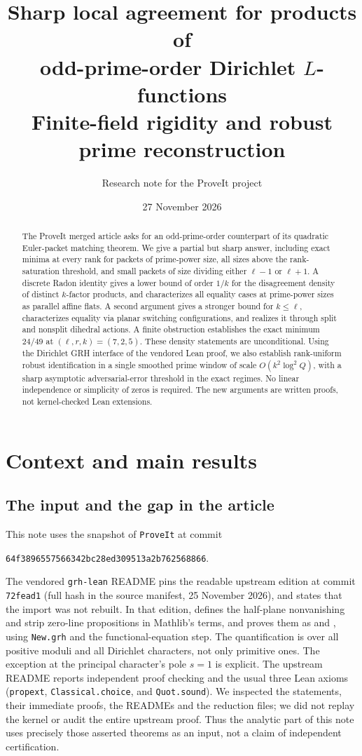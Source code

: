\documentclass[11pt]{article}
\title{Sharp local agreement for products of\\odd-prime-order Dirichlet $L$-functions\\[3pt]\large Finite-field rigidity and robust prime reconstruction}
\author{Research note for the ProveIt project}
\date{27 November 2026}
\theoremstyle{remark}\newtheorem{remark}[theorem]{Remark}
\begin{document}
\maketitle
\begin{abstract}
The ProveIt merged article asks for an odd-prime-order counterpart of its quadratic Euler-packet matching theorem. We give a partial but sharp answer, including exact minima at every rank for packets of prime-power size, all sizes above the rank-saturation threshold, and small packets of size dividing either $\ell-1$ or $\ell+1$. A discrete Radon identity gives a lower bound of order $1/k$ for the disagreement density of distinct $k$-factor products, and characterizes all equality cases at prime-power sizes as parallel affine flats. A second argument gives a stronger bound for $k\le\ell$, characterizes equality via planar switching configurations, and realizes it through split and nonsplit dihedral actions. A finite obstruction establishes the exact minimum $24/49$ at $(\ell,r,k)=(7,2,5)$. These density statements are unconditional. Using the Dirichlet GRH interface of the vendored Lean proof, we also establish rank-uniform robust identification in a single smoothed prime window of scale $O(k^2\log^2 Q)$, with a sharp asymptotic adversarial-error threshold in the exact regimes. No linear independence or simplicity of zeros is required. The new arguments are written proofs, not kernel-checked Lean extensions.
\end{abstract}
\tableofcontents

\section{Context and main results}
\subsection{The input and the gap in the article}
This note uses the snapshot of \texttt{ProveIt} at commit
\begin{center}\small\texttt{64f3896557566342bc28ed309513a2b762568866}.\end{center}
The vendored \texttt{grh-lean} README \cite{lean} pins the readable upstream edition at commit \texttt{72fead1} (full hash in the source manifest, 25 November 2026), and states that the import was not rebuilt. In that edition,  defines the half-plane nonvanishing and strip zero-line propositions in Mathlib's terms, and  proves them as  and , using \texttt{New.grh} and the functional-equation step. The quantification is over all positive moduli and all Dirichlet characters, not only primitive ones. The exception at the principal character's pole $s=1$ is explicit. The upstream README reports independent proof checking and the usual three Lean axioms (\texttt{propext}, \texttt{Classical.choice}, and \texttt{Quot.sound}). We inspected the statements, their immediate proofs, the READMEs and the reduction files; we did not replay the kernel or audit the entire upstream proof. Thus the analytic part of this note uses precisely those asserted theorems as an input, not a claim of independent certification.
\end{document}
